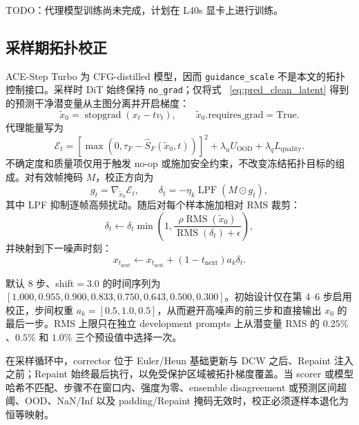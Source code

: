 \documentclass{article}
\begin{document}
\begin{tcolorbox}[colback=yellow!30,colframe=yellow!60,boxrule=0.5pt,arc=6pt,left=6pt,right=6pt,top=4pt,bottom=4pt]
TODO：代理模型训练尚未完成，计划在 L40s 显卡上进行训练。
\end{tcolorbox}

\subsection{采样期拓扑校正}

ACE-Step Turbo 为 CFG-distilled 模型，因而 \texttt{guidance\_scale} 不是本文的拓扑控制接口。采样时 DiT 始终保持 \texttt{no\_grad}；仅将式 ~\eqref{eq:pred_clean_latent} 得到的预测干净潜变量从主图分离并开启梯度：
\begin{equation}
\tilde{x}_0=\operatorname{stopgrad}(x_t-tv_t),\qquad
\tilde{x}_0.\mathrm{requires\_grad}=\mathrm{True}.
\end{equation}
代理能量写为
\begin{equation}
\mathcal{E}_t=
\left[\max(0,\tau_F-\hat{S}_F(\tilde{x}_0,t))\right]^2
+\lambda_uU_{\mathrm{OOD}}+\lambda_qL_{\mathrm{quality}}.
\end{equation}
不确定度和质量项仅用于触发 no-op 或施加安全约束，不改变冻结拓扑目标的组成。对有效帧掩码 $M$，校正方向为
\begin{equation}
g_t=\nabla_{\tilde{x}_0}\mathcal{E}_t,\qquad
\delta_t=-\eta_k\operatorname{LPF}(M\odot g_t),
\end{equation}
其中 LPF 抑制逐帧高频扰动。随后对每个样本施加相对 RMS 裁剪：
\begin{equation}
\delta_t\leftarrow\delta_t\min\left(1,
\frac{\rho\operatorname{RMS}(\tilde{x}_0)}
{\operatorname{RMS}(\delta_t)+\epsilon}\right),
\end{equation}
并映射到下一噪声时刻：
\begin{equation}
x_{t_{\mathrm{next}}}\leftarrow x_{t_{\mathrm{next}}}
+(1-t_{\mathrm{next}})a_k\delta_t.
\label{eq:topology_corrector_update}
\end{equation}

默认 $8$ 步、shift$=3.0$ 的时间序列为
$[1.000,0.955,0.900,0.833,0.750,0.643,0.500,0.300]$。初始设计仅在第 4--6 步启用校正，步间权重 $a_k=[0.5,1.0,0.5]$，从而避开高噪声的前三步和直接输出 $x_0$ 的最后一步。RMS 上限只在独立 development prompts 上从潜变量 RMS 的 $0.25\%$、$0.5\%$ 和 $1.0\%$ 三个预设值中选择一次。

在采样循环中，corrector 位于 Euler/Heun 基础更新与 DCW 之后、Repaint 注入之前；Repaint 始终最后执行，以免受保护区域被拓扑梯度覆盖。当 scorer 或模型哈希不匹配、步骤不在窗口内、强度为零、ensemble disagreement 或预测区间超阈、OOD、NaN/Inf 以及 padding/Repaint 掩码无效时，校正必须逐样本退化为恒等映射。
\end{document}
